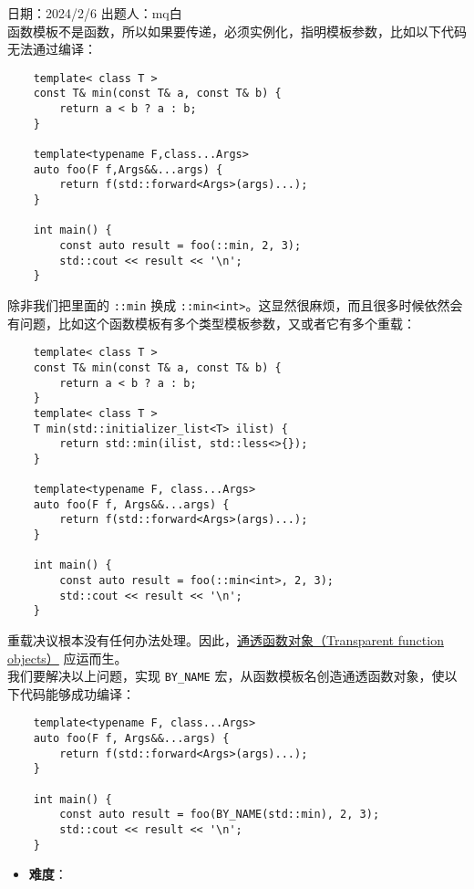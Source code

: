 日期：2024/2/6 出题人：mq白\\

函数模板不是函数，所以如果要传递，必须实例化，指明模板参数，比如以下代码无法通过编译：

\begin{verbatim}
    template< class T >
    const T& min(const T& a, const T& b) {
        return a < b ? a : b;
    }

    template<typename F,class...Args>
    auto foo(F f,Args&&...args) {
        return f(std::forward<Args>(args)...);
    }

    int main() {
        const auto result = foo(::min, 2, 3);
        std::cout << result << '\n';
    }
\end{verbatim}

除非我们把里面的 \texttt{::min} 换成 \texttt{::min<int>}。这显然很麻烦，而且很多时候依然会有问题，比如这个函数模板有多个类型模板参数，又或者它有多个重载：

\begin{verbatim}
    template< class T >
    const T& min(const T& a, const T& b) {
        return a < b ? a : b;
    }
    template< class T >
    T min(std::initializer_list<T> ilist) {
        return std::min(ilist, std::less<>{});
    }

    template<typename F, class...Args>
    auto foo(F f, Args&&...args) {
        return f(std::forward<Args>(args)...);
    }

    int main() {
        const auto result = foo(::min<int>, 2, 3);
        std::cout << result << '\n';
    }
\end{verbatim}

重载决议根本没有任何办法处理。因此，\href{https://en.cppreference.com/w/cpp/utility/functional#Transparent_function_objects}{通透函数对象（Transparent function objects）} 应运而生。\\

我们要解决以上问题，实现 \texttt{BY_NAME} 宏，从函数模板名创造通透函数对象，使以下代码能够成功编译：

\begin{verbatim}
    template<typename F, class...Args>
    auto foo(F f, Args&&...args) {
        return f(std::forward<Args>(args)...);
    }

    int main() {
        const auto result = foo(BY_NAME(std::min), 2, 3);
        std::cout << result << '\n';
    }
\end{verbatim}

\begin{itemize}
    \item \textbf{难度}： 
\end{itemize}
